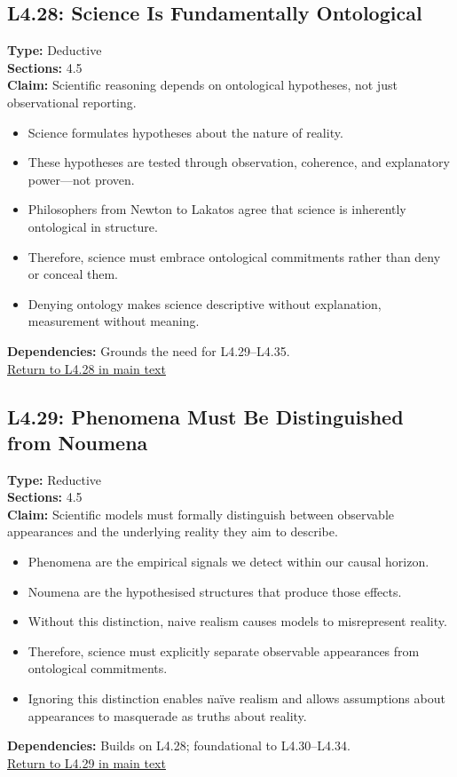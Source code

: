 \documentclass[12pt]{book}
\newcommand{\returnlink}[1]{\hyperref[logic:#1]{Return to #1 in main text}\xspace}
\begin{document}
\subsection*{L4.28: Science Is Fundamentally Ontological}
\label{appendix:L4.28}
\textbf{Type:} Deductive \\
\textbf{Sections:} 4.5 \\
\textbf{Claim:} Scientific reasoning depends on ontological hypotheses, not just observational reporting.
\begin{itemize}
  \item Science formulates hypotheses about the nature of reality.
  \item These hypotheses are tested through observation, coherence, and explanatory power---not proven.
  \item Philosophers from Newton to Lakatos agree that science is inherently ontological in structure.
  \item Therefore, science must embrace ontological commitments rather than deny or conceal them.
  \item Denying ontology makes science descriptive without explanation, measurement without meaning.
\end{itemize}
\textbf{Dependencies:} Grounds the need for L4.29–L4.35.\\
\returnlink{L4.28}

\subsection*{L4.29: Phenomena Must Be Distinguished from Noumena}
\label{appendix:L4.29}
\textbf{Type:} Reductive \\
\textbf{Sections:} 4.5 \\
\textbf{Claim:} Scientific models must formally distinguish between observable appearances and the underlying reality they aim to describe.
\begin{itemize}
  \item Phenomena are the empirical signals we detect within our causal horizon.
  \item Noumena are the hypothesised structures that produce those effects.
  \item Without this distinction, naive realism causes models to misrepresent reality.
  \item Therefore, science must explicitly separate observable appearances from ontological commitments.
  \item Ignoring this distinction enables naïve realism and allows assumptions about appearances to masquerade as truths about reality.
\end{itemize}
\textbf{Dependencies:} Builds on L4.28; foundational to L4.30–L4.34.\\
\returnlink{L4.29}
\end{document}

